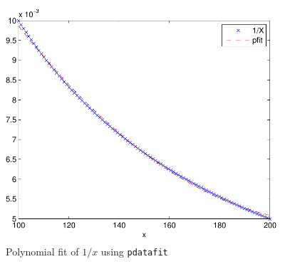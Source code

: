 \documentclass{article}
\begin{document}
\begin{figure}[h]
\begin{center}
\includegraphics[width=4in]{figs/pdatafitPLOT.pdf}
\caption{Polynomial fit of $1/x$ using \texttt{pdatafit}}
\end{center}
\end{figure}

\newpage
\end{document}
